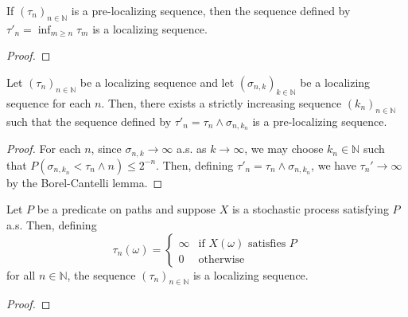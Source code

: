 \begin{lemma}\label{lem:isLocalizingSequence_of_isPreLocalizingSequence}
  \leanok
If $(\tau_n)_{n \in \mathbb{N}}$ is a pre-localizing sequence, then the sequence defined by $\tau'_n = \inf_{m \ge n} \tau_m$ is a localizing sequence.
\end{lemma}

\begin{proof}\leanok

\end{proof}


\begin{lemma}\label{lem:isPreLocalizingSequence_of_isLocalizingSequence}
  \mathlibok
Let $(\tau_n)_{n \in \mathbb{N}}$ be a localizing sequence and let $(\sigma_{n,k})_{k \in \mathbb{N}}$ be a localizing sequence for each $n$.
Then, there exists a strictly increasing sequence $(k_n)_{n \in \mathbb{N}}$ such that the sequence defined by $\tau'_n = \tau_n \wedge \sigma_{n,k_n}$ is a pre-localizing sequence.
\end{lemma}

\begin{proof}\mathlibok
  For each $n$, since $\sigma_{n,k} \to \infty$ a.s. as $k \to \infty$, we may choose $k_n \in \mathbb{N}$ such that $P(\sigma_{n,k_n} < \tau_n \wedge n) \le 2^{-n}$.
  Then, defining $\tau'_n = \tau_n \wedge \sigma_{n,k_n}$, we have $\tau_n' \to \infty$ by the Borel-Cantelli lemma.
\end{proof}


\begin{lemma}\label{lem:isLocalizingSequence_ae}
  \leanok
  Let $P$ be a predicate on paths and suppose $X$ is a stochastic process satisfying $P$ a.s. Then, defining
  $$\tau_n(\omega) =
  \begin{cases}
    \infty & \text{if } X(\omega) \text{ satisfies } P \\
    0 & \text{otherwise}
  \end{cases}
  $$
  for all $n \in \mathbb{N}$, the sequence $(\tau_n)_{n \in \mathbb{N}}$ is a localizing sequence.
\end{lemma}

\begin{proof}\leanok
\end{proof}



